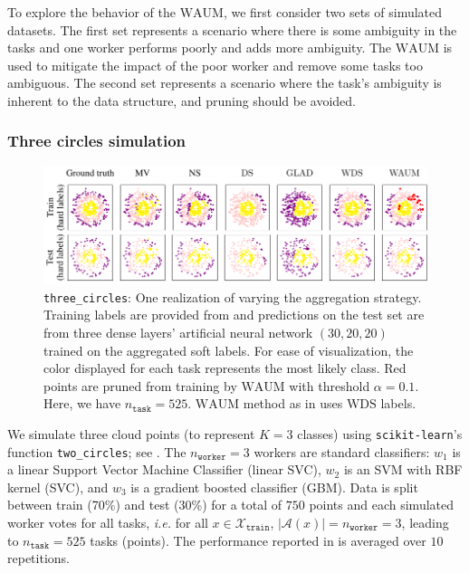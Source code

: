 To explore the behavior of the $\mathrm{WAUM}$, we first consider two sets of simulated datasets.
The first set represents a scenario where there is some ambiguity in the tasks and one worker performs poorly and adds more ambiguity. The $\mathrm{WAUM}$ is used to mitigate the impact of the poor worker and remove some tasks too ambiguous.
The second set represents a scenario where the task's ambiguity is inherent to the data structure, and pruning should be avoided.

\subsubsection*{Three circles simulation}

\begin{figure}[thb]
    \centering
    \includegraphics[width=.8\textwidth]{images/Preds3circles}
    \caption{\texttt{three\_circles}: One realization of  varying the aggregation strategy. Training labels are provided from  and predictions on the test set are from three dense layers' artificial neural network $(30, 20, 20)$ trained on the aggregated soft labels. For ease of visualization, the color displayed for each task represents the most likely class.
        Red points are pruned from training by $\mathrm{WAUM}$ with threshold $\alpha=0.1$. Here, we have $n_{\texttt{task}}=525$.
        $\mathrm{WAUM}$ method as in  uses $\mathrm{WDS}$ labels.
        }
    \label{fig:threecircles_predictions}
\end{figure}

We simulate three cloud points (to represent $K=3$ classes) using \texttt{scikit-learn}'s function \texttt{two\_circles}; see .
The $n_\texttt{worker}=3$ workers are standard classifiers: $w_1$ is a linear Support Vector Machine Classifier (linear SVC), $w_2$ is an SVM with RBF kernel (SVC), and $w_3$ is a gradient boosted classifier (GBM).
Data is split between train (70\%) and test (30\%) for a total of $750$ points and each simulated worker votes for all tasks, \emph{i.e.} for all $x\in\mathcal{X}_\texttt{train}$, $|\mathcal{A}(x)|=n_\texttt{worker}=3$, leading to $n_{\texttt{task}}=525$ tasks (points).
The performance reported in  is averaged over $10$ repetitions.

